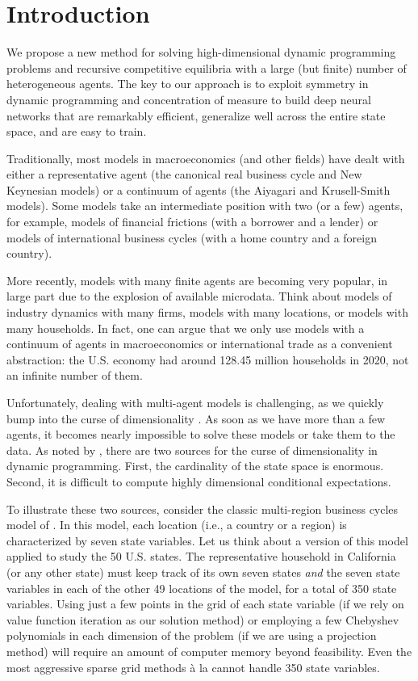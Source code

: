 \documentclass[12pt]{article}
\begin{document}
\newpage

\section{Introduction}

We propose a new method for solving high-dimensional dynamic programming problems and recursive competitive equilibria with a large (but finite) number of heterogeneous agents. The key to our approach is to exploit symmetry in dynamic programming and concentration of measure to build deep neural networks that are remarkably efficient, generalize well across the entire state space, and are easy to train.

Traditionally, most models in macroeconomics (and other fields) have dealt with either a representative agent (the canonical real business cycle and New Keynesian models) or a continuum of agents (the Aiyagari and Krusell-Smith models). Some models take an intermediate position with two (or a few) agents, for example, models of financial frictions (with a borrower and a lender) or models of international business cycles (with a home country and a foreign country).

More recently, models with many finite agents are becoming very popular, in large part due to the explosion of available microdata. Think about models of industry dynamics with many firms, models with many locations, or models with many households. In fact, one can argue that we only use models with a continuum of agents in macroeconomics or international trade as a convenient abstraction: the U.S. economy had around 128.45 million households in 2020, not an infinite number of them.
	
Unfortunately, dealing with multi-agent models is challenging, as we quickly bump into the curse of dimensionality \citep[p. ix]{Bellman1957}. As soon as we have more than a few agents, it becomes nearly impossible to solve these models or take them to the data. As noted by \citet{powell2007approximate}, there are two sources for the curse of dimensionality in dynamic programming. First, the cardinality of the state space is enormous. Second, it is difficult to compute highly dimensional conditional expectations.

To illustrate these two sources, consider the classic multi-region business cycles model of \citet{Backus1992}. In this model, each location (i.e., a country or a region) is characterized by seven state variables. Let us think about a version of this model applied to study the 50 U.S. states. The representative household in California (or any other state) must keep track of its own seven states \textit{and} the seven state variables in each of the other 49 locations of the model, for a total of 350 state variables. Using just a few points in the grid of each state variable (if we rely on value function iteration as our solution method) or employing a few Chebyshev polynomials in each dimension of the problem (if we are using a projection method) will require an amount of computer memory beyond feasibility. Even the most aggressive sparse grid methods \`a la \citet{Brumm2017} cannot handle 350 state variables.
\end{document}
